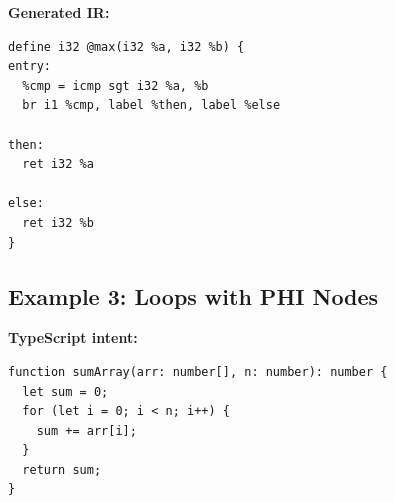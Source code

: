 \documentclass[11pt]{article}
\begin{document}
\textbf{Generated IR:}
\begin{lstlisting}[style=ir]
define i32 @max(i32 %a, i32 %b) {
entry:
  %cmp = icmp sgt i32 %a, %b
  br i1 %cmp, label %then, label %else

then:
  ret i32 %a

else:
  ret i32 %b
}
\end{lstlisting}

\subsection{Example 3: Loops with PHI Nodes}

\textbf{TypeScript intent:}
\begin{lstlisting}[style=ts]
function sumArray(arr: number[], n: number): number {
  let sum = 0;
  for (let i = 0; i < n; i++) {
    sum += arr[i];
  }
  return sum;
}
\end{lstlisting}
\end{document}
